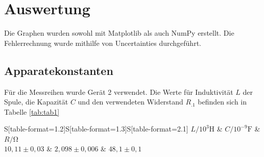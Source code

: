 \section{Auswertung}
\label{sec:Auswertung}


Die Graphen wurden sowohl mit Matplotlib \cite{matplotlib} als auch NumPy \cite{numpy} erstellt. Die
Fehlerrechnung wurde mithilfe von Uncertainties \cite{uncertainties} durchgeführt.

\subsection{Apparatekonstanten}
Für die Messreihen wurde Gerät 2 verwendet.
Die Werte für Induktivität $L$ der Spule, die Kapazität $C$ und den verwendeten Widerstand $R_.1$ befinden sich in Tabelle \ref{tab:tab1}

\begin{table}
	\centering
	\caption{Apparatekonstanten}
\label{tab:tab1}
	\begin{tabular}{S[table-format=1.2]S[table-format=1.3]S[table-format=2.1]}
		\toprule
		{$L/ 10^3 \si{\henry}$} & {$C/10^{-9}\si{\farad}$} & {$R/\si{\ohm}$} \\
		\midrule
		${10,11\pm 0,03}$ & ${2,098\pm 0,006}$ & ${48,1\pm 0,1}$ \\
		\bottomrule
	\end{tabular}
\end{table}
